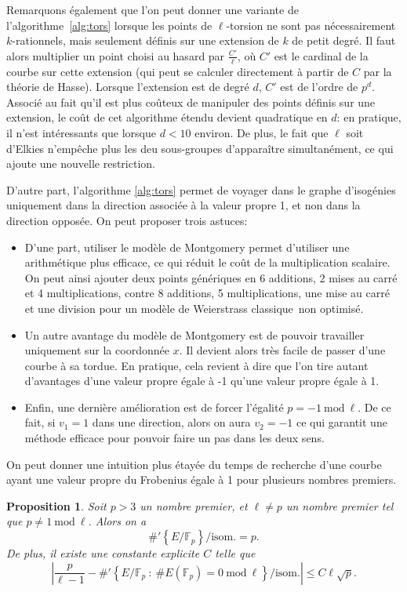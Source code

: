 \documentclass[11pt,a4paper]{article}
\newcommand{\F}{\mathbb{F}}
\renewcommand{\mod}{\ \mathrm{mod}\ }
\renewcommand{\v}{\vspace{5mm}}
\newtheorem*{prop}{Proposition}
\theoremstyle{definition}
\begin{document}
Remarquons également que l'on peut donner une variante de l'algorithme~\ref{alg:tors} lorsque les points de $\ell$-torsion ne sont pas nécessairement $k$-rationnels, mais seulement définis sur une extension de $k$ de petit degré. Il faut alors multiplier un point choisi au hasard par $\frac{C'}{\ell}$, où $C'$ est le cardinal de la courbe sur cette extension (qui peut se calculer directement à partir de $C$ par la théorie de Hasse). Lorsque l'extension est de degré $d$, $C'$ est de l'ordre de $p^d$. Associé au fait qu'il est plus coûteux de manipuler des points définis sur une extension, le coût de cet algorithme étendu devient quadratique en $d$: en pratique, il n'est intéressants que lorsque $d<10$ environ. De plus, le fait que $\ell$ soit d'Elkies n'empêche plus les deu sous-groupes d'apparaître simultanément, ce qui ajoute une nouvelle restriction.

\v
D'autre part, l'algorithme \ref{alg:tors} permet de voyager dans le graphe d'isogénies uniquement dans la direction associée à la valeur propre 1, et non dans la direction opposée. On peut proposer trois astuces:
\begin{itemize}
\item D'une part, utiliser le modèle de Montgomery permet d'utiliser une arithmétique plus efficace, ce qui réduit le coût de la multiplication scalaire. On peut ainsi ajouter deux points génériques en 6 additions, 2 mises au carré et 4 multiplications, contre 8 additions, 5 multiplications, une mise au carré et une division pour un modèle de Weierstrass \og classique\fg\ non optimisé.

\item Un autre avantage du modèle de Montgomery est de pouvoir travailler uniquement sur la coordonnée $x$. Il devient alors très facile de passer d'une courbe à sa tordue. En pratique, cela revient à dire que l'on tire autant d'avantages d'une valeur propre égale à -1 qu'une valeur propre égale à 1.

\item Enfin, une dernière amélioration est de forcer l'égalité $p = -1 \mod\ell$. De ce fait, si $v_1 = 1$ dans une direction, alors on aura $v_2 = -1$ ce qui garantit une méthode efficace pour pouvoir faire un pas dans les deux sens.
\end{itemize}
\v
On peut donner une intuition plus étayée du temps de recherche d'une courbe ayant une valeur propre du Frobenius égale à 1 pour plusieurs nombres premiers.

\begin{prop}
Soit $p>3$ un nombre premier, et $\ell\neq p$ un nombre premier tel que $p\neq 1 \mod\ell$. Alors on a
$$ \#'\left\{E/\F_p \right\}/\mathrm{isom.} = p.$$
De plus, il existe une constante explicite $C$ telle que
$$ \left| \frac{p}{\ell - 1}  - \#' \left\{E/\F_p\ :\ \#E(\F_p) = 0 \mod\ell\right\}/\mathrm{isom.} \right|\leq C\ell\sqrt{p}.$$
\end{prop}
\end{document}
